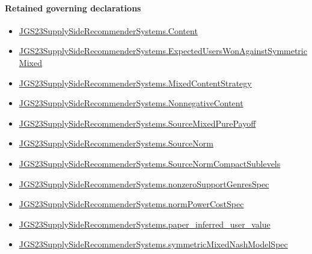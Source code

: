 \documentclass[10pt]{article}
\begin{document}
\paragraph{Retained governing declarations}
\begin{itemize}\raggedright
\item \hyperlink{governing-declaration-367305fda50f0ada}{JGS23\allowbreak{}Supply\allowbreak{}Side\allowbreak{}Recommender\allowbreak{}Systems.\allowbreak{}Content}
\item \hyperlink{governing-declaration-3a110916ca7725ab}{JGS23\allowbreak{}Supply\allowbreak{}Side\allowbreak{}Recommender\allowbreak{}Systems.\allowbreak{}Expected\allowbreak{}Users\allowbreak{}Won\allowbreak{}Against\allowbreak{}Symmetric\allowbreak{}Mixed}
\item \hyperlink{governing-declaration-2089965d06cf0282}{JGS23\allowbreak{}Supply\allowbreak{}Side\allowbreak{}Recommender\allowbreak{}Systems.\allowbreak{}Mixed\allowbreak{}Content\allowbreak{}Strategy}
\item \hyperlink{governing-declaration-d426babe40b9593c}{JGS23\allowbreak{}Supply\allowbreak{}Side\allowbreak{}Recommender\allowbreak{}Systems.\allowbreak{}Nonnegative\allowbreak{}Content}
\item \hyperlink{governing-declaration-d3239873ad21d76c}{JGS23\allowbreak{}Supply\allowbreak{}Side\allowbreak{}Recommender\allowbreak{}Systems.\allowbreak{}Source\allowbreak{}Mixed\allowbreak{}Pure\allowbreak{}Payoff}
\item \hyperlink{governing-declaration-6141339a5d3412d9}{JGS23\allowbreak{}Supply\allowbreak{}Side\allowbreak{}Recommender\allowbreak{}Systems.\allowbreak{}Source\allowbreak{}Norm}
\item \hyperlink{governing-declaration-0d92048317064110}{JGS23\allowbreak{}Supply\allowbreak{}Side\allowbreak{}Recommender\allowbreak{}Systems.\allowbreak{}Source\allowbreak{}Norm\allowbreak{}Compact\allowbreak{}Sublevels}
\item \hyperlink{governing-declaration-588c7a0b2af225d7}{JGS23\allowbreak{}Supply\allowbreak{}Side\allowbreak{}Recommender\allowbreak{}Systems.\allowbreak{}nonzero\allowbreak{}Support\allowbreak{}Genres\allowbreak{}Spec}
\item \hyperlink{governing-declaration-6ba13dc1cae95e6e}{JGS23\allowbreak{}Supply\allowbreak{}Side\allowbreak{}Recommender\allowbreak{}Systems.\allowbreak{}norm\allowbreak{}Power\allowbreak{}Cost\allowbreak{}Spec}
\item \hyperlink{governing-declaration-48347eafb3702717}{JGS23\allowbreak{}Supply\allowbreak{}Side\allowbreak{}Recommender\allowbreak{}Systems.\allowbreak{}paper\_\allowbreak{}inferred\_\allowbreak{}user\_\allowbreak{}value}
\item \hyperlink{paper-prerequisite-b412efba7deb757f}{JGS23\allowbreak{}Supply\allowbreak{}Side\allowbreak{}Recommender\allowbreak{}Systems.\allowbreak{}symmetric\allowbreak{}Mixed\allowbreak{}Nash\allowbreak{}Model\allowbreak{}Spec}
\end{itemize}
\end{document}
